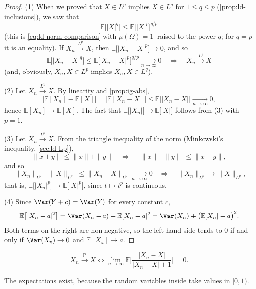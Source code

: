\begin{proof}
(1) When we proved that $X\in L^p$ implies $X\in L^q$ for $1\le q\le p$
(\cref{prop:ld-inclusions}), we saw that
\[
  \mathbb E\big[|X|^q\big]\le\mathbb E\big[|X|^p\big]^{q/p}
\]
(this is \eqref{eq:ld-norm-comparison} with $\mu(\Omega)=1$, raised to the power $q$; for $q=p$
it is an equality). If $X_n\xrightarrow{L^p}X$, then $\mathbb E\big[|X_n-X|^p\big]\to0$, and so
\[
  \mathbb E\big[|X_n-X|^q\big]\le\mathbb E\big[|X_n-X|^p\big]^{q/p}\xrightarrow[n\to\infty]{}0
  \quad\Longrightarrow\quad X_n\xrightarrow{L^q}X
\]
(and, obviously, $X_n,X\in L^p$ implies $X_n,X\in L^q$).

(2) Let $X_n\xrightarrow{L^1}X$. By linearity and \cref{prop:ig-abs},
\[
  \big|\mathbb E[X_n]-\mathbb E[X]\big|=\big|\mathbb E[X_n-X]\big|\le\mathbb E\big[|X_n-X|\big]\xrightarrow[n\to\infty]{}0,
\]
hence $\mathbb E[X_n]\to\mathbb E[X]$. The fact that $\mathbb E\big[|X_n|\big]\to\mathbb E\big[|X|\big]$
follows from (3) with $p=1$.

(3) Let $X_n\xrightarrow{L^p}X$. From the triangle inequality of the norm (Minkowski's inequality,
\cref{sec:ld-Lp}),
\[
  \|x+y\|\le\|x\|+\|y\|\quad\Longrightarrow\quad\big|\|x\|-\|y\|\big|\le\|x-y\| ,
\]
and so
\[
  \big|\|X_n\|_{L^p}-\|X\|_{L^p}\big|\le\|X_n-X\|_{L^p}\xrightarrow[n\to\infty]{}0
  \quad\Longrightarrow\quad\|X_n\|_{L^p}\to\|X\|_{L^p},
\]
that is, $\mathbb E\big[|X_n|^p\big]\to\mathbb E\big[|X|^p\big]$, since $t\mapsto t^p$ is
continuous.

(4) Since $\Var(Y+c)=\Var(Y)$ for every constant $c$,
\[
  \mathbb E\big[|X_n-a|^2\big]=\Var(X_n-a)+\mathbb E[X_n-a]^2=\Var(X_n)+\big(\mathbb E[X_n]-a\big)^2 .
\]
Both terms on the right are non-negative, so the left-hand side tends to $0$ if and only if
$\Var(X_n)\to0$ and $\mathbb E[X_n]\to a$.
\end{proof}

\begin{proposition}\label{prop:ll-metric}
\[
  X_n\xrightarrow{\mathbb P}X\iff\lim_{n\to\infty}\mathbb E\bigg[\frac{|X_n-X|}{|X_n-X|+1}\bigg]=0 .
\]
\end{proposition}

The expectations exist, because the random variables inside take values in $[0,1)$.

